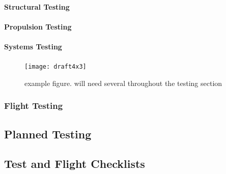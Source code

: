 \paragraph{Structural Testing}

\paragraph{Propulsion Testing}

\paragraph{Systems Testing}


\lipsum[1-5]

\begin{figure}[h!]
	\centering
	\texttt{[image: draft4x3]}
	\caption{example figure. will need several throughout the testing section}
	\label{fig:}
\end{figure}

\lipsum[6-10]



\subsubsection{Flight Testing}
\label{sssec:flighttesting}

\lipsum[1-10]

\subsection{Planned Testing}
\label{ssec:plannedtesting}

\lipsum[1]

\subsection{Test and Flight Checklists}


